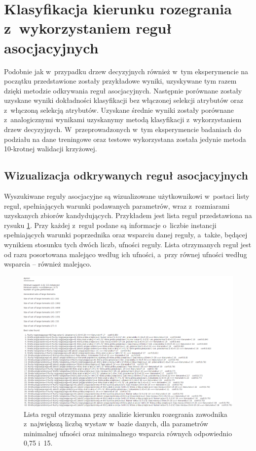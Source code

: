 \documentclass[a4paper,twoside,12pt]{book}
\begin{document}
\section{Klasyfikacja kierunku rozegrania z~wykorzystaniem reguł asocjacyjnych}
\label{roz:klasyfikacja-reguly}
Podobnie jak w~przypadku drzew decyzyjnych również w~tym eksperymencie na początku przedstawione zostały przykładowe wyniki, uzyskywane tym razem dzięki metodzie odkrywania reguł asocjacyjnych. Następnie porównane zostały uzyskane wyniki dokładności klasyfikacji bez włączonej selekcji atrybutów oraz z~włączoną selekcją atrybutów. Uzyskane średnie wyniki zostały porównane z~analogicznymi wynikami uzyskanymy metodą klasyfikacji z~wykorzystaniem drzew decyzyjnych. W~przeprowadzonych w~tym eksperymencie badaniach do podziału na dane treningowe oraz testowe wykorzystana została jedynie metoda 10-krotnej walidacji krzyżowej.

\subsection{Wizualizacja odkrywanych reguł asocjacyjnych}
\label{roz:wizReguly}
Wyszukiwane reguły asocjacyjne są wizualizowane użytkownikowi w~postaci listy reguł, spełniających warunki podawanych parametrów, wraz z~rozmiarami uzyskanych zbiorów kandydujących. Przykładem jest lista reguł przedstawiona na rysuku \ref{fig:reguly}. Przy każdej z~reguł podane są informacje o~liczbie instancji spełniających warunki poprzednika oraz wsparciu danej reguły, a~także, będącej wynikiem stosunku tych dwóch liczb, ufności reguły. Lista otrzymanych reguł jest od razu posortowana malejąco według ich ufności, a~przy równej ufności według wsparcia -- również malejąco. 

\begin{figure}
\centering
\includegraphics[width=\columnwidth]{reguly}
\caption{Lista reguł otrzymana przy analizie kierunku rozegrania zawodnika z~największą liczbą wystaw w~bazie danych, dla parametrów minimalnej ufności oraz minimalnego wsparcia równych odpowiednio 0,75 i~15.}
\label{fig:reguly}
\end{figure}
\end{document}
